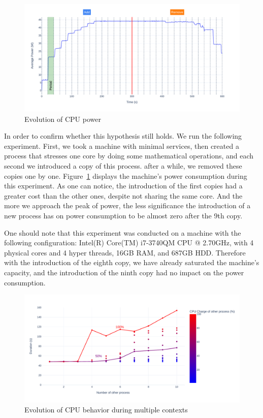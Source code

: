 \begin{figure}[!h]
      \centering
      \caption{Evolution of CPU power}
      \label{fig:power_evolution_greenfaas}
      \includegraphics[width=\linewidth]{chapters/power_evolution_greenfaas}
\end{figure}

In order to confirm whether this hypothesis still holds. We run the following experiment.
First, we took a machine with minimal services, then created a process that stresses one core by doing some mathematical operations, and each second we introduced a copy of this process. after a while, we removed these copies one by one.
Figure~\ref{fig:power_evolution_greenfaas} displays the machine's power consumption during this experiment. As one can notice, the introduction of the first copies had a greater cost than the other ones, despite not sharing the same core. And the more we approach the peak of power, the less significance the introduction of a new process has on power consumption to be almost zero after the 9th copy.

One should note that this experiment was conducted on a machine with the following configuration:
Intel(R) Core(TM) i7-3740QM CPU @ 2.70GHz, with 4 physical cores and 4 hyper threads, 16GB RAM, and 687GB HDD.
Therefore with the introduction of the eighth copy, we have already saturated the machine's capacity, and the introduction of the ninth copy had no impact on the power consumption.
\begin{figure}[!h]
      \centering
      \includegraphics[width=\linewidth]{chapters/green_faas_duration}
      \caption{Evolution of CPU behavior during multiple contexts }
      \label{fig:green_faas_duration}
\end{figure}

